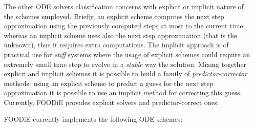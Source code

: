 \documentclass[pdftex,preprint,3p,times,numbers]{elsarticle}
\begin{document}
The other ODE solvers classification concerns with explicit or implicit nature of the schemes employed. Briefly, an explicit scheme computes the next step approximation using the previously computed steps at most to the current time, whereas an implicit scheme uses also the next step approximation (that is the unknown), thus it requires extra computations. The implicit approach is of practical use for \emph{stiff} systems where the usage of explicit schemes could require an extremely small time step to evolve in a \emph{stable} way the solution. Mixing together explicit and implicit schemes it is possible to build a family of \emph{predictor-corrector} methods: using an explicit scheme to predict a guess for the next step approximation it is possible to use an implicit method for correcting this guess. Currently, FOODiE provides explicit solvers and predictor-correct ones.

FOODiE currently implements the following ODE schemes:
\end{document}
